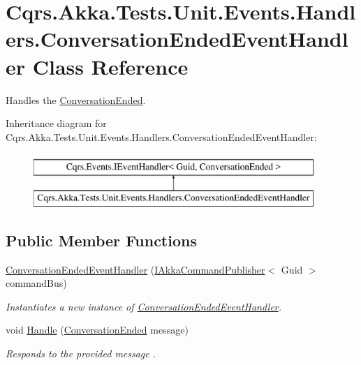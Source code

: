 \hypertarget{classCqrs_1_1Akka_1_1Tests_1_1Unit_1_1Events_1_1Handlers_1_1ConversationEndedEventHandler}{}\section{Cqrs.\+Akka.\+Tests.\+Unit.\+Events.\+Handlers.\+Conversation\+Ended\+Event\+Handler Class Reference}
\label{classCqrs_1_1Akka_1_1Tests_1_1Unit_1_1Events_1_1Handlers_1_1ConversationEndedEventHandler}


Handles the \hyperlink{classCqrs_1_1Akka_1_1Tests_1_1Unit_1_1Events_1_1ConversationEnded}{Conversation\+Ended}.  


Inheritance diagram for Cqrs.\+Akka.\+Tests.\+Unit.\+Events.\+Handlers.\+Conversation\+Ended\+Event\+Handler\+:\begin{figure}[H]
\begin{center}
\leavevmode
\includegraphics[height=2.000000cm]{classCqrs_1_1Akka_1_1Tests_1_1Unit_1_1Events_1_1Handlers_1_1ConversationEndedEventHandler}
\end{center}
\end{figure}
\subsection*{Public Member Functions}
\begin{DoxyCompactItemize}
\item 
\hyperlink{classCqrs_1_1Akka_1_1Tests_1_1Unit_1_1Events_1_1Handlers_1_1ConversationEndedEventHandler_a4e335a0e004613251aafed4230ba33cd_a4e335a0e004613251aafed4230ba33cd}{Conversation\+Ended\+Event\+Handler} (\hyperlink{interfaceCqrs_1_1Akka_1_1Commands_1_1IAkkaCommandPublisher}{I\+Akka\+Command\+Publisher}$<$ Guid $>$ command\+Bus)
\begin{DoxyCompactList}\small\item\em Instantiates a new instance of \hyperlink{classCqrs_1_1Akka_1_1Tests_1_1Unit_1_1Events_1_1Handlers_1_1ConversationEndedEventHandler}{Conversation\+Ended\+Event\+Handler}. \end{DoxyCompactList}\item 
void \hyperlink{classCqrs_1_1Akka_1_1Tests_1_1Unit_1_1Events_1_1Handlers_1_1ConversationEndedEventHandler_a1e363c715cefdb600705d7b3f5e3bca6_a1e363c715cefdb600705d7b3f5e3bca6}{Handle} (\hyperlink{classCqrs_1_1Akka_1_1Tests_1_1Unit_1_1Events_1_1ConversationEnded}{Conversation\+Ended} message)
\begin{DoxyCompactList}\small\item\em Responds to the provided {\itshape message} . \end{DoxyCompactList}\end{DoxyCompactItemize}
